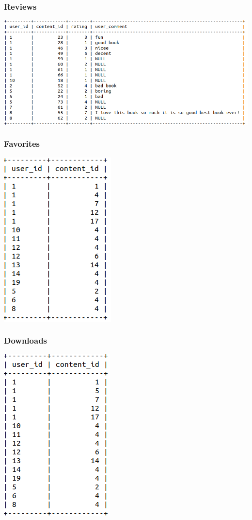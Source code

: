 \documentclass[letter, 12pt, titlepage]{article}
\begin{document}
\subsubsection{Reviews}
\includegraphics[scale=.5]{reviews.png}
\subsubsection{Favorites}
\includegraphics[scale=.5]{favorites.png}
\subsubsection{Downloads}
\includegraphics[scale=.5]{downloads.png}
\end{document}
